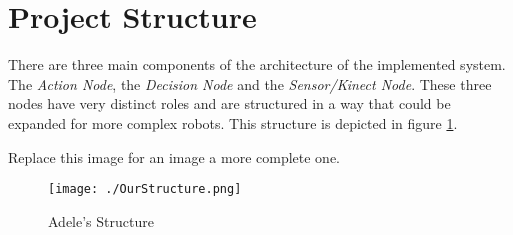 \section{Project Structure}

There are three main components of the architecture of the implemented system. The \textit{Action Node}, the \textit{Decision Node} and the \textit{Sensor/Kinect Node}. These three nodes have very distinct roles and are structured in a way that could be expanded for more complex robots. This structure is depicted in figure \ref{fig:adele_structure}.


\color{red}
	Replace this image for an image a more complete one.
\color{black}

\begin{figure}[!ht]
    \centering
    \texttt{[image: ./OurStructure.png]}
    \caption{Adele's Structure}
    \label{fig:adele_structure}
\end{figure}




